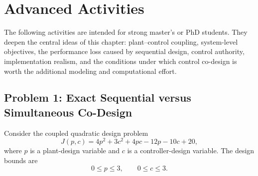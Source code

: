 
\section{Advanced Activities}

The following activities are intended for strong master's or PhD students.
They deepen the central ideas of this chapter: plant--control coupling,
system-level objectives, the performance loss caused by sequential design,
control authority, implementation realism, and the conditions under which
control co-design is worth the additional modeling and computational effort.

\subsection*{Problem 1: Exact Sequential versus Simultaneous Co-Design}

Consider the coupled quadratic design problem
\begin{equation}
J(p,c)
=
4p^2+3c^2+4pc-12p-10c+20,
\end{equation}
where $p$ is a plant-design variable and $c$ is a controller-design
variable. The design bounds are
\begin{equation}
0\leq p\leq3,
\qquad
0\leq c\leq3.
\end{equation}

